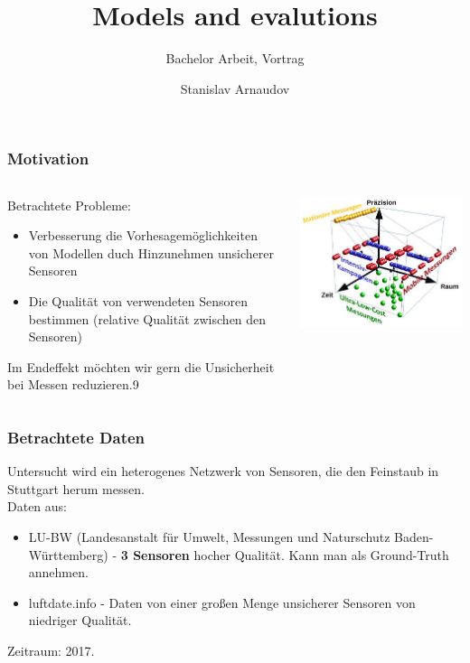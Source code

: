 \documentclass[18pt]{beamer}
\title[Short title]{Models and evalutions}
\subtitle{Bachelor Arbeit, Vortrag}
\author{Stanislav Arnaudov}
\institute{TECO - Das Telecooperation Office}
\begin{document}
 




\begin{frame}
 \titlepage
\end{frame}

\begin{frame}
  \frametitle{Motivation}
  
  \begin{columns}
    \begin{column}{0.4\textwidth}
      Betrachtete Probleme:
      \begin{itemize}
      \item Verbesserung die Vorhesagemöglichkeiten von Modellen duch Hinzunehmen unsicherer Sensoren
      \item Die Qualität von verwendeten Sensoren bestimmen (relative Qualität zwischen den Sensoren)
      \end{itemize}
      Im Endeffekt möchten wir gern die Unsicherheit bei Messen reduzieren.9
    \end{column}
    \begin{column}{0.6\textwidth}
      \begin{center}
        \includegraphics[scale=0.5]{images/motivation}
      \end{center}
    \end{column}
  \end{columns}
  
\end{frame}

\begin{frame}
  \frametitle{Betrachtete Daten}
  Untersucht wird ein heterogenes Netzwerk von Sensoren, die den Feinstaub in Stuttgart herum messen.\\
  Daten aus:
  \begin{itemize}
  \item LU-BW (Landesanstalt für Umwelt, Messungen und Naturschutz Baden-Württemberg) - \textbf{3 Sensoren} hocher Qualität. Kann man als Ground-Truth annehmen.
  \item luftdate.info - Daten von einer großen Menge unsicherer Sensoren von niedriger Qualität.
  \end{itemize}
  Zeitraum: 2017.
  
\end{frame}
\end{document}
